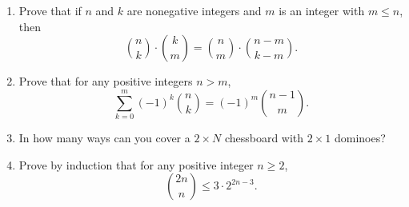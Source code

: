 \documentclass[11pt]{article}
\begin{document}
\begin{enumerate}
\item Prove that if $n$ and $k$ are nonegative integers and $m$ is an integer with $m \le n$, then
\[
\binom{n}{k} \cdot \binom{k}{m} = \binom{n}{m} \cdot \binom{n-m}{k-m}.
\]





\item Prove that for any positive integers $n > m$,
\[
\sum_{k=0}^m (-1)^k \binom{n}{k} = (-1)^m \binom{n-1}{m}.
\]



\item In how many ways can you cover a $2\times N$ chessboard with $2\times 1$ dominoes?


\item Prove by induction that for any positive integer $n\ge 2$,
\[
\binom{2n}{n} \le 3 \cdot 2^{2n-3}.
\]




\end{enumerate}
\end{document}
